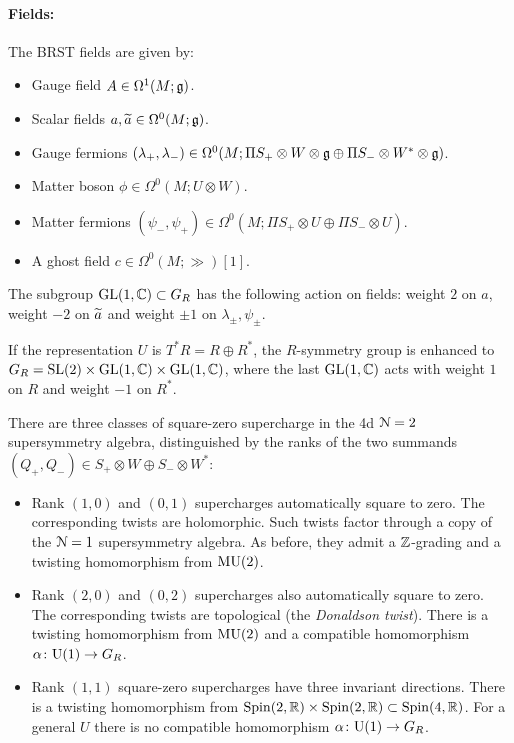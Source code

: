 \documentclass[10pt, oneside]{article}
\begin{document}
\paragraph{Fields:} The BRST fields are given by:
\begin{itemize}
\item Gauge field $A \in \Omega^1(M; \mathfrak g)$.
\item Scalar fields $a, \widetilde{a}\in\Omega^0(M;\mathfrak g)$.
\item Gauge fermions $(\lambda_+, \lambda_-) \in \Omega^0(M; \Pi S_+ \otimes W\otimes \mathfrak g \oplus \Pi S_- \otimes W^*\otimes \mathfrak g)$.
\item Matter boson $\phi\in\Omega^0(M; U\otimes W)$.
\item Matter fermions $(\psi_-, \psi_+)\in\Omega^0(M; \Pi S_+\otimes U\oplus \Pi S_-\otimes U)$.
\item A ghost field $c\in \Omega^0(M; \gg)[1]$.
\end{itemize}

The subgroup $\mathrm{GL}(1, \mathbb C)\subset G_R$ has the following action on fields: weight $2$ on $a$, weight $-2$ on $\widetilde{a}$ and weight $\pm 1$ on $\lambda_\pm,\psi_\pm$.

If the representation $U$ is $T^*R = R\oplus R^*$, the $R$-symmetry group is enhanced to $G_R=\mathrm{SL}(2)\times \mathrm{GL}(1, \mathbb C)\times \mathrm{GL}(1, \mathbb C)$, where the last $\mathrm{GL}(1, \mathbb C)$ acts with weight $1$ on $R$ and weight $-1$ on $R^*$.

There are three classes of square-zero supercharge in the 4d $\mathcal{N}=2$ supersymmetry algebra, distinguished by the ranks of the two summands $(Q_+,Q_-) \in S_+ \otimes W \oplus S_- \otimes W^*$:
\begin{itemize}
 \item Rank $(1,0)$ and $(0,1)$ supercharges automatically square to zero.  
 The corresponding twists are holomorphic.
 Such twists factor through a copy of the $\mathcal N = 1$ supersymmetry algebra. As before, they admit a $\mathbb Z$-grading and a twisting homomorphism from $\mathrm{MU}(2)$.
 \item Rank $(2,0)$ and $(0,2)$ supercharges also automatically square to zero. The corresponding twists are topological (the \emph{Donaldson twist}). There is a twisting homomorphism from $\mathrm{MU}(2)$ and a compatible homomorphism $\alpha\colon \mathrm{U}(1)\rightarrow G_R$.
 \item Rank $(1,1)$ square-zero supercharges have three invariant directions. There is a twisting homomorphism from $\mathrm{Spin}(2, \mathbb R)\times \mathrm{Spin}(2, \mathbb R)\subset \mathrm{Spin}(4, \mathbb R)$. For a general $U$ there is no compatible homomorphism $\alpha\colon \mathrm{U}(1)\rightarrow G_R$.
\end{itemize}
\end{document}
